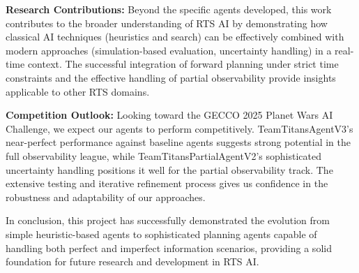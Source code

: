 \documentclass[conference]{IEEEtran}
\begin{document}
\textbf{Research Contributions:} Beyond the specific agents developed, this work contributes to the broader understanding of RTS AI by demonstrating how classical AI techniques (heuristics and search) can be effectively combined with modern approaches (simulation-based evaluation, uncertainty handling) in a real-time context. The successful integration of forward planning under strict time constraints and the effective handling of partial observability provide insights applicable to other RTS domains.

\textbf{Competition Outlook:} Looking toward the GECCO 2025 Planet Wars AI Challenge, we expect our agents to perform competitively. TeamTitansAgentV3's near-perfect performance against baseline agents suggests strong potential in the full observability league, while TeamTitansPartialAgentV2's sophisticated uncertainty handling positions it well for the partial observability track. The extensive testing and iterative refinement process gives us confidence in the robustness and adaptability of our approaches.

In conclusion, this project has successfully demonstrated the evolution from simple heuristic-based agents to sophisticated planning agents capable of handling both perfect and imperfect information scenarios, providing a solid foundation for future research and development in RTS AI.
\end{document}
